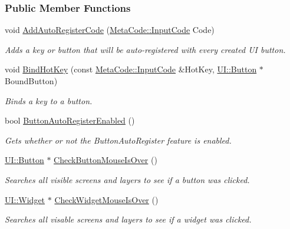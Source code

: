 \subsubsection*{Public Member Functions}
\begin{DoxyCompactItemize}
\item 
void \hyperlink{classphys_1_1UIManager_ac44c38c26dece8a5d2087cb9ab2eac15}{AddAutoRegisterCode} (\hyperlink{classphys_1_1MetaCode_a3e501cbb5bf0f6f1fdb7211465bda8d8}{MetaCode::InputCode} Code)
\begin{DoxyCompactList}\small\item\em Adds a key or button that will be auto-\/registered with every created UI button. \item\end{DoxyCompactList}\item 
void \hyperlink{classphys_1_1UIManager_a935d79d7b2ba71075c330e6bc0c7391c}{BindHotKey} (const \hyperlink{classphys_1_1MetaCode_a3e501cbb5bf0f6f1fdb7211465bda8d8}{MetaCode::InputCode} \&HotKey, \hyperlink{classphys_1_1UI_1_1Button}{UI::Button} $\ast$BoundButton)
\begin{DoxyCompactList}\small\item\em Binds a key to a button. \item\end{DoxyCompactList}\item 
bool \hyperlink{classphys_1_1UIManager_aa55bfb557af6569914662e3786b86a7a}{ButtonAutoRegisterEnabled} ()
\begin{DoxyCompactList}\small\item\em Gets whether or not the ButtonAutoRegister feature is enabled. \item\end{DoxyCompactList}\item 
\hyperlink{classphys_1_1UI_1_1Button}{UI::Button} $\ast$ \hyperlink{classphys_1_1UIManager_aa1022fcbe8e1efc7a383b2eff834a152}{CheckButtonMouseIsOver} ()
\begin{DoxyCompactList}\small\item\em Searches all visible screens and layers to see if a button was clicked. \item\end{DoxyCompactList}\item 
\hyperlink{classphys_1_1UI_1_1Widget}{UI::Widget} $\ast$ \hyperlink{classphys_1_1UIManager_ab9840b483409d3453a67931b4d858d1b}{CheckWidgetMouseIsOver} ()
\begin{DoxyCompactList}\small\item\em Searches all visable screens and layers to see if a widget was clicked. \item\end{DoxyCompactList}\item 

\end{DoxyCompactItemize}
